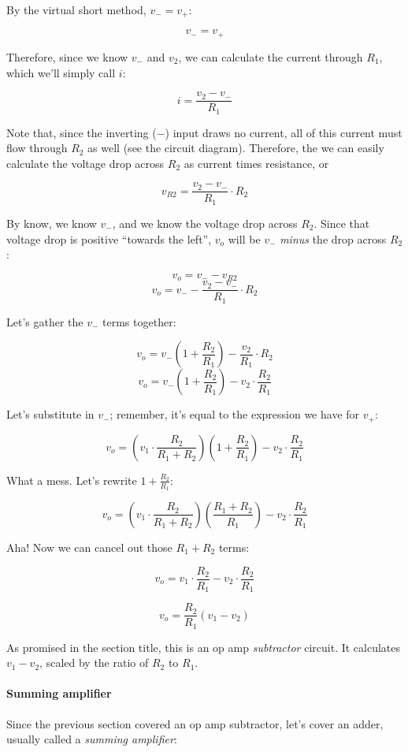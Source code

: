 By the virtual short method, $v_- = v_+$:

\[ v_- = v_+ \]

Therefore, since we know $v_-$ and $v_2$, we can calculate the current through $R_1$, which we'll simply call $i$:

\[ i = \frac{v_2 - v_-}{R_1} \]

Note that, since the inverting ($-$) input draws no current, all of this current must flow through $R_2$ as well (see the circuit diagram). Therefore, the we can easily calculate the voltage drop across $R_2$ as current times resistance, or

\[ v_{R2} = \frac{v_2 - v_-}{R_1} \cdot R_2 \] 

By know, we know $v_-$, and we know the voltage drop across $R_2$. Since that voltage drop is positive ``towards the left'', $v_o$ will be $v_-$ \emph{minus} the drop across $R_2$:

\[ v_o = v_- - v_{R2} \]
\[ v_o = v_- - \frac{v_2 - v_-}{R_1} \cdot R_2 \]

Let's gather the $v_-$ terms together:

\[ v_o = v_-(1 + \frac{R_2}{R_1}) - \frac{v_2}{R_1} \cdot R_2 \]
\[ v_o = v_-(1 + \frac{R_2}{R_1}) - v_2 \cdot \frac{R_2}{R_1} \]

Let's substitute in $v_-$; remember, it's equal to the expression we have for $v_+$:

\[ v_o = (v_1 \cdot \frac{R_2}{R_1 + R_2}) (1 + \frac{R_2}{R_1}) - v_2 \cdot \frac{R_2}{R_1} \]

What a mess. Let's rewrite $\displaystyle 1 + \frac{R_2}{R_1}$:

\[ v_o = (v_1 \cdot \frac{R_2}{R_1 + R_2}) (\frac{R_1 + R_2}{R_1}) - v_2 \cdot \frac{R_2}{R_1} \]

Aha! Now we can cancel out those $R_1 + R_2$ terms:

\[ v_o = v_1 \cdot \frac{R_2}{R_1} - v_2 \cdot \frac{R_2}{R_1} \]

\[ v_o = \frac{R_2}{R_1} \left(v_1 - v_2 \right) \]

As promised in the section title, this is an op amp \emph{subtractor} circuit. It calculates $v_1 - v_2$, scaled by the ratio of $R_2$ to $R_1$.

\paragraph{Summing amplifier}
Since the previous section covered an op amp subtractor, let's cover an adder, usually called a \emph{summing amplifier}:\\

